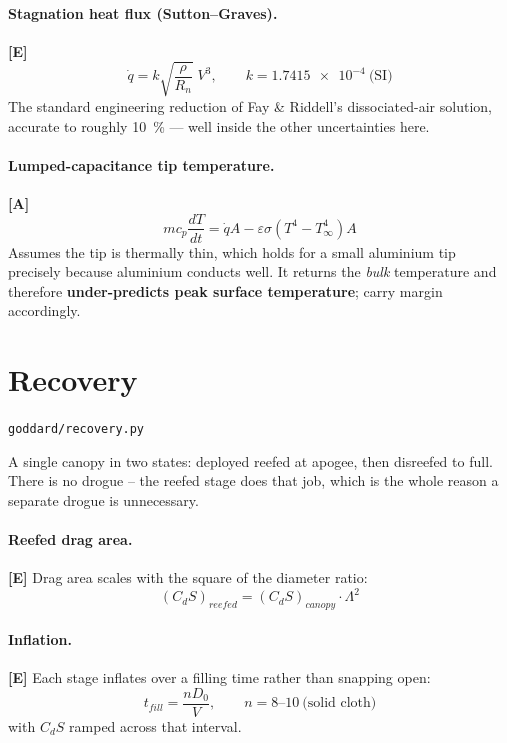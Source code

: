 \documentclass[11pt,a4paper]{article}
\newcommand{\established}{\textcolor{okgreen}{\textbf{[E]}}\xspace}
\newcommand{\approxi}{\textcolor{amber}{\textbf{[A]}}\xspace}
\newcommand{\src}[1]{\hfill{\footnotesize\texttt{#1}}}
\begin{document}
\paragraph{Stagnation heat flux (Sutton--Graves).} \established
\begin{equation}
\dot q = k\sqrt{\frac{\rho}{R_n}}\;V^3,
\qquad k = \num{1.7415e-4}\ \text{(SI)}
\end{equation}
The standard engineering reduction of Fay \& Riddell's dissociated-air solution,
accurate to roughly \SI{10}{\percent} --- well inside the other uncertainties
here.

\paragraph{Lumped-capacitance tip temperature.} \approxi
\begin{equation}
m c_p \frac{dT}{dt} = \dot q A - \varepsilon \sigma\left(T^4 - T_\infty^4\right) A
\end{equation}
Assumes the tip is thermally thin, which holds for a small aluminium tip
precisely because aluminium conducts well. It returns the \emph{bulk}
temperature and therefore \textbf{under-predicts peak surface temperature};
carry margin accordingly.

\section{Recovery}
\src{goddard/recovery.py}

A single canopy in two states: deployed reefed at apogee, then disreefed
to full. There is no drogue -- the reefed stage does that job, which is the
whole reason a separate drogue is unnecessary.

\paragraph{Reefed drag area.} \established
Drag area scales with the square of the diameter ratio:
\begin{equation}
(C_dS)_{reefed} = (C_dS)_{canopy}\cdot \Lambda^2
\end{equation}

\paragraph{Inflation.} \established
Each stage inflates over a filling time rather than snapping open:
\begin{equation}
t_{fill} = \frac{n D_0}{V}, \qquad n = 8\text{--}10 \ \text{(solid cloth)}
\end{equation}
with $C_dS$ ramped across that interval.
\end{document}
